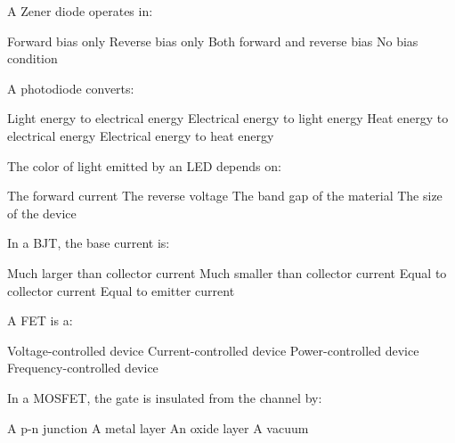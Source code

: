 \begin{question}[2]
A Zener diode operates in:

\begin{oneparcheckboxes}
\choice Forward bias only
\correctchoice Reverse bias only
\choice Both forward and reverse bias
\choice No bias condition
\end{oneparcheckboxes}
\end{question}

\begin{question}[2]
A photodiode converts:

\begin{oneparcheckboxes}
\correctchoice Light energy to electrical energy
\choice Electrical energy to light energy
\choice Heat energy to electrical energy
\choice Electrical energy to heat energy
\end{oneparcheckboxes}
\end{question}

\begin{question}[2]
The color of light emitted by an LED depends on:

\begin{oneparcheckboxes}
\choice The forward current
\choice The reverse voltage
\correctchoice The band gap of the material
\choice The size of the device
\end{oneparcheckboxes}
\end{question}

\begin{question}[2]
In a BJT, the base current is:

\begin{oneparcheckboxes}
\choice Much larger than collector current
\correctchoice Much smaller than collector current
\choice Equal to collector current
\choice Equal to emitter current
\end{oneparcheckboxes}
\end{question}

\begin{question}[2]
A FET is a:

\begin{oneparcheckboxes}
\correctchoice Voltage-controlled device
\choice Current-controlled device
\choice Power-controlled device
\choice Frequency-controlled device
\end{oneparcheckboxes}
\end{question}

\begin{question}[2]
In a MOSFET, the gate is insulated from the channel by:

\begin{oneparcheckboxes}
\choice A p-n junction
\choice A metal layer
\correctchoice An oxide layer
\choice A vacuum
\end{oneparcheckboxes}
\end{question}


